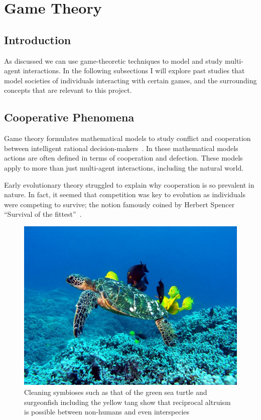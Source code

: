 \documentclass[]{final_report}
\begin{document}
\section{Game Theory}
\label{sec:backgroundgametheory}

\subsection{Introduction}
As discussed we can use game-theoretic techniques to model and study multi-agent interactions. In the following subsections I will explore past studies that model societies of individuals interacting with certain games, and the surrounding concepts that are relevant to this project.

\subsection{Cooperative Phenomena}
Game theory formulates mathematical models to study conflict and cooperation between intelligent rational decision-makers~\cite{myerson2013game}. In these mathematical models actions are often defined in terms of cooperation and defection. These models apply to more than just multi-agent interactions, including the natural world.\par 
Early evolutionary theory struggled to explain why cooperation is so prevalent in nature. In fact, it seemed that competition was key to evolution as individuals were competing to survive; the notion famously coined by Herbert Spencer ``Survival of the fittest''~\cite{spencer1864principles}.\par
\begin{figure}
\vspace{-20pt}
\begin{framed}
	\center
	\includegraphics[width=\textwidth]{Green_Sea_Turtle_Cleaning_Station.jpg}
	\caption{Cleaning symbioses such as that of the green sea turtle and surgeonfish including the yellow tang show that reciprocal altruism is possible between non-humans and even interspecies~\cite{turtle}}
	\label{fig:cleaning}
\end{framed}
\vspace{-40pt}
\end{figure}
\end{document}
